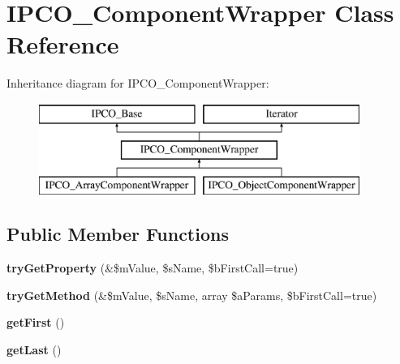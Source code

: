 \hypertarget{class_i_p_c_o___component_wrapper}{\section{I\-P\-C\-O\-\_\-\-Component\-Wrapper Class Reference}
\label{class_i_p_c_o___component_wrapper}
}
Inheritance diagram for I\-P\-C\-O\-\_\-\-Component\-Wrapper\-:\begin{figure}[H]
\begin{center}
\leavevmode
\includegraphics[height=3.000000cm]{class_i_p_c_o___component_wrapper}
\end{center}
\end{figure}
\subsection*{Public Member Functions}
\begin{DoxyCompactItemize}
\item 
\hypertarget{class_i_p_c_o___component_wrapper_aaf3730efce8827334b4d8e607c0890b0}{{\bfseries try\-Get\-Property} (\&\$m\-Value, \$s\-Name, \$b\-First\-Call=true)}\label{class_i_p_c_o___component_wrapper_aaf3730efce8827334b4d8e607c0890b0}

\item 
\hypertarget{class_i_p_c_o___component_wrapper_ae9692c6435c54f514232f3361ad00bbf}{{\bfseries try\-Get\-Method} (\&\$m\-Value, \$s\-Name, array \$a\-Params, \$b\-First\-Call=true)}\label{class_i_p_c_o___component_wrapper_ae9692c6435c54f514232f3361ad00bbf}

\item 
\hypertarget{class_i_p_c_o___component_wrapper_a4b4bc3aa2548478413849b3144535f25}{{\bfseries get\-First} ()}\label{class_i_p_c_o___component_wrapper_a4b4bc3aa2548478413849b3144535f25}

\item 
\hypertarget{class_i_p_c_o___component_wrapper_af478ffc28a45378fca61195140b60e25}{{\bfseries get\-Last} ()}\label{class_i_p_c_o___component_wrapper_af478ffc28a45378fca61195140b60e25}

\end{DoxyCompactItemize}
